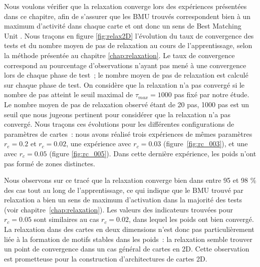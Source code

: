 \documentclass[../main]{subfiles}
\begin{document}
Nous voulons vérifier que la relaxation converge lors des expériences présentées dans ce chapitre, afin de s'assurer que les BMU trouvés correspondent bien à un maximum d'activité dans chaque carte et ont donc un sens de \og Best Matching Unit \fg{}.
Nous traçons en figure \ref{fig:relax2D} l'évolution du taux de convergence des tests et du nombre moyen de pas de relaxation au cours de l'apprentissage, selon la méthode présentée au chapitre \ref{chap:relaxation}. Le taux de convergence correspond au pourcentage d'observations n'ayant pas mené à une convergence lors de chaque phase de test~; le nombre moyen de pas de relaxation est calculé sur chaque phase de test.
On considère que la relaxation n'a pas convergé si le nombre de pas atteint le seuil maximal de $\tau_{max} = 1000$ pas fixé par notre étude. Le nombre moyen de pas de relaxation observé étant de 20 pas, 1000 pas est un seuil que nous jugeons pertinent pour considérer que la relaxation n'a pas convergé.
Nous traçons ces évolutions pour les différentes configurations de paramètres de cartes~: nous avons réalisé trois expériences de mêmes paramètres $r_e=0.2$ et $r_c = 0.02$, une expérience avec $r_c = 0.03$ (figure~\ref{fig:rc_003}), et une avec $r_c = 0.05$ (figure \ref{fig:rc_005}).
Dans cette dernière expérience, les poids n'ont pas formé de zones distinctes.


Nous observons sur ce tracé que la relaxation converge bien dans entre 95 et 98 \% des cas tout au long de l'apprentissage, ce qui indique que le BMU trouvé par relaxation a bien un sens de maximum d'activation dans la majorité des tests (voir chapitre~\ref{chap:relaxation}).
Les valeurs des indicateurs trouvées pour $r_c = 0.05$ sont similaires au cas $r_c = 0.02$, dans lequel les poids ont bien convergé. La relaxation dans des cartes en deux dimensions n'est donc pas particulièrement liée à la formation de motifs stables dans les poids~: la relaxation semble trouver un point de convergence dans un cas général de cartes en 2D. Cette observation est prometteuse pour la construction d'architectures de cartes 2D.
\end{document}
